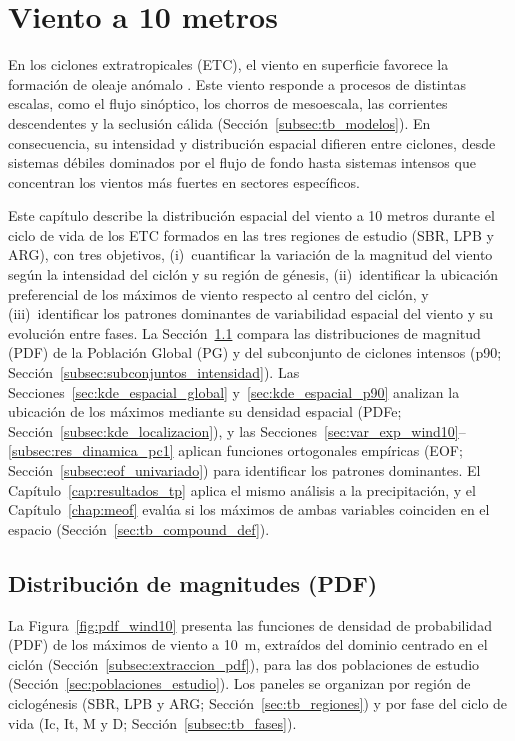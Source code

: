 \chapter{Viento a 10 metros}\label{cap:resultados_wind10}

En los ciclones extratropicales (ETC), el viento en superficie favorece la formación de oleaje anómalo \citep{gramcianinov2023impact}. 
Este viento responde a procesos de distintas escalas, como el flujo sinóptico, los chorros de mesoescala, las corrientes descendentes y la seclusión cálida (Sección~\ref{subsec:tb_modelos}). 
En consecuencia, su intensidad y distribución espacial difieren entre ciclones, desde sistemas débiles dominados por el flujo de fondo hasta sistemas intensos que concentran los vientos más fuertes en sectores específicos.

Este capítulo describe la distribución espacial del viento a 10 metros durante el ciclo de vida de los ETC formados en las tres regiones de estudio (SBR, LPB y ARG), con tres objetivos, (i)~cuantificar la variación de la magnitud del viento según la intensidad del ciclón y su región de génesis, (ii)~identificar la ubicación preferencial de los máximos de viento respecto al centro del ciclón, y (iii)~identificar los patrones dominantes de variabilidad espacial del viento y su evolución entre fases.
La Sección~\ref{sec:pdf_wind10} compara las distribuciones de magnitud (PDF) de la Población Global (PG) y del subconjunto de ciclones intensos (p90; Sección~\ref{subsec:subconjuntos_intensidad}). 
Las Secciones~\ref{sec:kde_espacial_global} y~\ref{sec:kde_espacial_p90} analizan la ubicación de los máximos mediante su densidad espacial (PDFe; Sección~\ref{subsec:kde_localizacion}), y las Secciones~\ref{sec:var_exp_wind10}--\ref{subsec:res_dinamica_pc1} aplican funciones ortogonales empíricas (EOF; Sección~\ref{subsec:eof_univariado}) para identificar los patrones dominantes.
El Capítulo~\ref{cap:resultados_tp} aplica el mismo análisis a la precipitación, y el Capítulo~\ref{chap:meof} evalúa si los máximos de ambas variables coinciden en el espacio (Sección~\ref{sec:tb_compound_def}).

\section{Distribución de magnitudes (PDF)}\label{sec:pdf_wind10}

La Figura~\ref{fig:pdf_wind10} presenta las funciones de densidad de probabilidad (PDF) de los máximos de viento a 10~m, extraídos del dominio centrado en el ciclón (Sección~\ref{subsec:extraccion_pdf}), para las dos poblaciones de estudio (Sección~\ref{sec:poblaciones_estudio}). 
Los paneles se organizan por región de ciclogénesis (SBR, LPB y ARG; Sección~\ref{sec:tb_regiones}) y por fase del ciclo de vida (Ic, It, M y D; Sección~\ref{subsec:tb_fases}).

